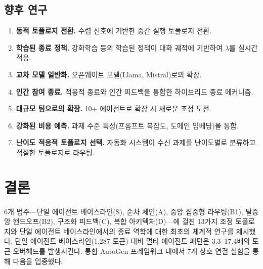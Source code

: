 \subsection{향후 연구}

\begin{enumerate}
\item \textbf{동적 토폴로지 전환.} 수렴 신호에 기반한 중간 실행 토폴로지 전환.
\item \textbf{학습된 종료 정책.} 강화학습 등의 학습된 정책이 대화 궤적에 기반하여 $\lambda$를 실시간 적응.
\item \textbf{교차 모델 일반화.} 오픈웨이트 모델(Llama, Mistral)로의 확장.
\item \textbf{인간 참여 종료.} 적응적 종료와 인간 피드백을 통합한 하이브리드 종료 메커니즘.
\item \textbf{대규모 팀으로의 확장.} 10+ 에이전트로 확장 시 새로운 조정 도전.
\item \textbf{강화된 비용 예측.} 과제 수준 특성(프롬프트 복잡도, 도메인 임베딩)을 통합.
\item \textbf{난이도 적응적 토폴로지 선택.} 자동화 시스템이 수신 과제를 난이도별로 분류하고 적절한 토폴로지로 라우팅.
\end{enumerate}

\section{결론}
\label{sec:conclusion}

6개 범주---단일 에이전트 베이스라인(S), 순차 체인(A), 중앙 집중형 라우팅(B1), 탈중앙 핸드오프(B2), 구조화 피드백(C), 복합 아키텍처(D)---에 걸친 13가지 조정 토폴로지와 단일 에이전트 베이스라인에서의 종료 역학에 대한 최초의 체계적 연구를 제시했다. 단일 에이전트 베이스라인(1,287 토큰) 대비 멀티 에이전트 패턴은 3.3--17.4배의 토큰 오버헤드를 발생시킨다. 통합 AutoGen 프레임워크 내에서 7개 상호 연결 실험을 통해 다음을 입증했다:

